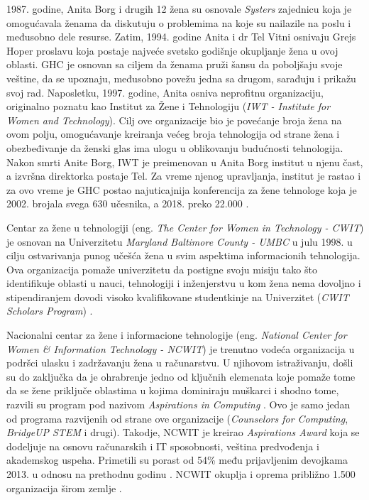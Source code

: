 1987. godine, Anita Borg i drugih 12 žena su osnovale \emph{Systers} zajednicu koja je omogućavala ženama da diskutuju o problemima na koje su nailazile na poslu i međusobno dele resurse. Zatim, 1994. godine Anita i dr Tel Vitni osnivaju Grejs Hoper proslavu koja postaje najveće svetsko godišnje okupljanje žena u ovoj oblasti. GHC je osnovan sa ciljem da ženama pruži šansu da poboljšaju svoje veštine, da se upoznaju, međusobno povežu jedna sa drugom, sarađuju i prikažu svoj rad. Naposletku, 1997. godine, Anita osniva neprofitnu organizaciju, originalno poznatu kao Institut za Žene i Tehnologiju (\emph{IWT - Institute for Women and Technology}). Cilj ove organizacije bio je povećanje broja žena na ovom polju, omogućavanje kreiranja većeg broja tehnologija od strane žena i obezbeđivanje da ženski glas ima ulogu u oblikovanju budućnosti tehnologija. Nakon smrti Anite Borg, IWT je preimenovan u Anita Borg institut u njenu čast, a izvršna direktorka postaje Tel. Za vreme njenog upravljanja, institut je rastao i za ovo vreme je GHC postao najuticajnija konferencija za žene tehnologe koja je 2002. brojala svega 630 učesnika, a 2018. preko 22.000 \cite{anitaborg}.

Centar za žene u tehnologiji (eng. \emph{The Center for Women in Technology - CWIT}) je osnovan na Univerzitetu \emph{Maryland Baltimore County - UMBC} u julu 1998. u cilju ostvarivanja punog učešća žena u svim aspektima informacionih tehnologija. Ova organizacija pomaže univerzitetu da postigne svoju misiju tako što identifikuje oblasti u nauci, tehnologiji i inženjerstvu u kom žena nema dovoljno i stipendiranjem dovodi visoko kvalifikovane studentkinje na Univerzitet (\emph{CWIT Scholars Program}) \cite{cwit}.

Nacionalni centar za žene i informacione tehnologije (eng. \emph{National Center for Women \& Information Technology - NCWIT}) je trenutno vodeća organizacija u podršci ulasku i zadržavanju žena u računarstvu. U njihovom istraživanju, došli su do zaključka da je ohrabrenje jedno od ključnih elemenata koje pomaže tome da se žene priključe oblastima u kojima dominiraju muškarci i shodno tome, razvili su program pod nazivom \emph{Aspirations in Computing} \cite{dubow2013bringing}. Ovo je samo jedan od programa razvijenih od strane ove organizacije (\emph{Counselors for Computing}, \emph{BridgeUP STEM} i drugi). Takodje, NCWIT je kreirao \emph{Aspirations Award} koja se dodeljuje na osnovu računarskih i IT sposobnosti, veština predvođenja i akademskog uspeha. Primetili su porast od 54\% među prijavljenim devojkama 2013. u odnosu na prethodnu godinu \cite{dubow2013bringing}. NCWIT okuplja i oprema približno 1.500 organizacija širom zemlje \cite{ncwit}.

